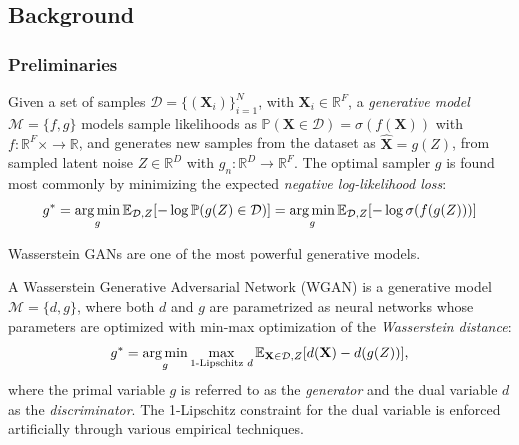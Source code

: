 
\subsection{Background}
\label{sec:background_gggcrp}

\subsubsection{Preliminaries}

\begin{definition}
    Given a set of samples $\mathcal{D}=\{(\mathbf{X}_i)\}_{i=1}^{N}$, with $\mathbf{X}_i \in \mathbb{R}^F$, a \emph{generative model} $\mathcal{M}=\{f,g\}$ models sample likelihoods as $\mathbb{P}(\mathbf{X} \in \mathcal{D})=\sigma(f(\mathbf{X}))$ with $f: \mathbb{R}^F \times \to \mathbb{R}$, and generates new samples from the dataset as $\hat{\mathbf{X}}=g(Z)$, from sampled latent noise $Z\in\mathbb{R}^D$ with $g_n:\mathbb{R}^D \to \mathbb{R}^F$. The optimal sampler $g$ is found most commonly by minimizing the expected \emph{negative log-likelihood loss}:
    \begin{equation}
        g^*=\operatorname*{arg\,min}_{g}{\mathbb{E}_{\mathcal{D},Z}[-\log{\mathbb{P}(g(Z) \in \mathcal{D})}]}=\operatorname*{arg\,min}_{g}{\mathbb{E}_{\mathcal{D},Z}[-\log{\sigma(f(g(Z)))}]}
    \end{equation}
\end{definition}

Wasserstein GANs are one of the most powerful generative models.

\begin{definition}
   A Wasserstein Generative Adversarial Network (WGAN) \cite{arjovsky_wasserstein_2017} is a generative model $\mathcal{M}=\{d,g\}$, where both $d$ and $g$ are parametrized as neural networks whose parameters are optimized with min-max optimization of the \emph{Wasserstein distance}:
   $$g^*=\operatorname*{arg\,min}_{g}\max_{\text{1-Lipschitz } d}{\mathbb{E}_{\mathbf{X}\in\mathcal{D},Z}[d(\mathbf{X})-d(g(Z))]},$$
   where the primal variable $g$ is referred to as the \emph{generator} and the dual variable $d$ as the \emph{discriminator}. The 1-Lipschitz constraint for the dual variable is enforced artificially through various empirical techniques.
\end{definition}

